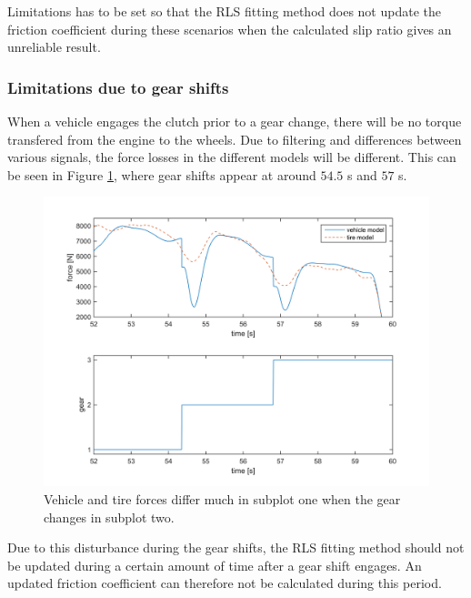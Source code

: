 Limitations has to be set so that the RLS fitting method does not update the friction coefficient during these scenarios when the calculated slip ratio gives an unreliable result.

\pagebreak
\subsubsection{Limitations due to gear shifts}
\label{sec:gearchange}
When a vehicle engages the clutch prior to a gear change, there will be no torque transfered from the engine to the wheels. Due to filtering and differences between various signals, the force losses in the different models will be different. This can be seen in Figure \ref{gear_change}, where gear shifts appear at around $ 54.5 $ s and $ 57 $ s.

\begin{figure}[h]
	\centering
	\includegraphics[width=1.0\textwidth]{Pictures/gear_change}
	\caption {Vehicle and tire forces differ much in subplot one when the gear changes in subplot two.}
	\label{gear_change}
\end{figure}

Due to this disturbance during the gear shifts, the RLS fitting method should not be updated during a certain amount of time after a gear shift engages. An updated friction coefficient can therefore not be calculated during this period. 

